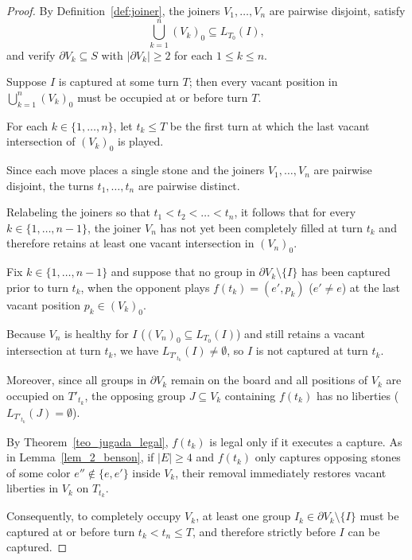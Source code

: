 \begin{proof}
	By Definition~\ref{def:joiner}, the joiners $V_1, \dots, V_n$ are pairwise disjoint, satisfy
	$$\bigcup_{k=1}^n (V_k)_0 \subseteq L_{T_0}(I),$$
	and verify $\partial V_k \subseteq S$ with $|\partial V_k| \ge 2$ for each $1 \le k \le n$.
	
	Suppose $I$ is captured at some turn $T$; then every vacant position in $\bigcup_{k=1}^n (V_k)_0$ must be occupied at or before turn $T$.
	
	For each $k \in \{1, \dots, n\}$, let $t_k \le T$ be the first turn at which the last vacant intersection of $(V_k)_0$ is played. 
	
	Since each move places a single stone and the joiners $V_1, \dots, V_n$ are pairwise disjoint, the turns $t_1, \dots, t_n$ are pairwise distinct. 
	
	Relabeling the joiners so that $t_1 < t_2 < \dots < t_n$, it follows that for every $k \in \{1, \dots, n-1\}$, the joiner $V_n$ has not yet been completely filled at turn $t_k$ and therefore retains at least one vacant intersection in $(V_n)_0$.
	
	Fix $k \in \{1, \dots, n-1\}$ and suppose that no group in $\partial V_k \setminus \{I\}$ has been captured prior to turn $t_k$, when the opponent plays $f(t_k) = (e', p_k)$ ($e' \neq e$) at the last vacant position $p_k \in (V_k)_0$. 
	
	Because $V_n$ is healthy for $I$ ($(V_n)_0 \subseteq L_{T_0}(I)$) and still retains a vacant intersection at turn $t_k$, we have $L_{T'_{t_k}}(I) \neq \emptyset$, so $I$ is not captured at turn $t_k$. 
	
	Moreover, since all groups in $\partial V_k$ remain on the board and all positions of $V_k$ are occupied on $T'_{t_k}$, the opposing group $J \subseteq V_k$ containing $f(t_k)$ has no liberties ($L_{T'_{t_k}}(J) = \emptyset$).
	
	By Theorem~\ref{teo_jugada_legal}, $f(t_k)$ is legal only if it executes a capture. As in Lemma~\ref{lem_2_benson}, if $|E| \ge 4$ and $f(t_k)$ only captures opposing stones of some color $e'' \notin \{e, e'\}$ inside $V_k$, their removal immediately restores vacant liberties in $V_k$ on $T_{t_k}$. 
	
	Consequently, to completely occupy $V_k$, at least one group $I_k \in \partial V_k \setminus \{I\}$ must be captured at or before turn $t_k < t_n \le T$, and therefore strictly before $I$ can be captured.
\end{proof}

